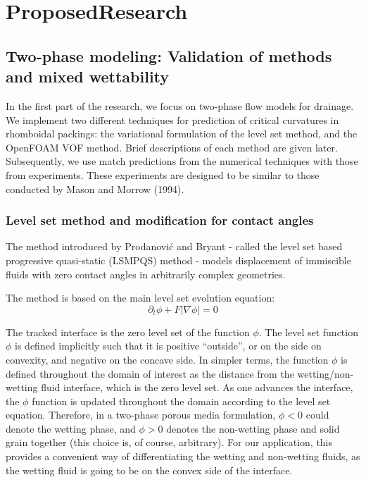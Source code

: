 
\section{ProposedResearch}

\subsection{Two-phase modeling: Validation of methods and mixed wettability}

In the first part of the research, we focus on two-phase flow models for drainage. We implement two different techniques for prediction of critical curvatures in rhomboidal packings: the variational formulation of the level set method, and the OpenFOAM VOF method. Brief descriptions of each method are given later. Subsequently, we use match predictions from the numerical techniques with those from experiments. These experiments are designed to be similar to those conducted by Mason and Morrow (1994). 

\subsubsection{Level set method and modification for contact angles}

The method introduced by Prodanovi\'{c} and Bryant \cite{prodanovic_porous_2006} - called the level set based progressive quasi-static (LSMPQS) method - models displacement  of immiscible fluids with zero contact angles in arbitrarily complex geometries.

The method is based on the main level set evolution equation:
\begin{equation} 
		\label{eq:levelset}
		\partial_t\phi + F|\nabla\phi| = 0
\end{equation}

The tracked interface is the zero level set of the function $\phi$. The level set function $\phi$ is defined implicitly such that it is positive ``outside'', or on the side on convexity, and negative on the concave side. In simpler terms, the function $\phi$ is defined throughout the domain of interest as the distance from the wetting/non-wetting fluid interface, which is the zero level set. As one advances the interface, the $\phi$ function is updated throughout the domain according to the level set equation. Therefore, in a two-phase porous media formulation, $\phi <0$ could denote the wetting phase, and $\phi>0$ denotes the non-wetting phase and solid grain together (this choice is, of course, arbitrary). For our application, this provides a convenient way of differentiating the wetting and non-wetting fluids, as the wetting fluid is going to be on the convex side of the interface. 

